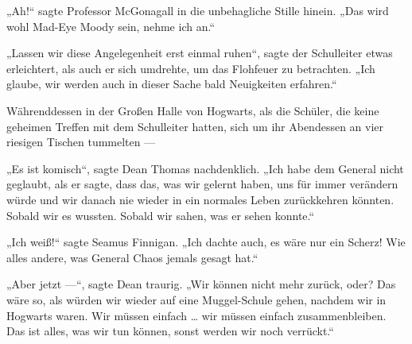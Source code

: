 „Ah!“ sagte Professor McGonagall in die unbehagliche Stille hinein.
„Das wird wohl Mad-Eye Moody sein, nehme ich an.“

„Lassen wir diese Angelegenheit erst einmal ruhen“, sagte der Schulleiter etwas erleichtert, als auch er sich umdrehte, um das Flohfeuer zu betrachten.
„Ich glaube, wir werden auch in dieser Sache bald Neuigkeiten erfahren.“


Währenddessen in der Großen Halle von Hogwarts, als die Schüler, die keine geheimen Treffen mit dem Schulleiter hatten, sich um ihr Abendessen an vier riesigen Tischen tummelten —

„Es ist komisch“, sagte Dean Thomas nachdenklich.
„Ich habe dem General nicht geglaubt, als er sagte, dass das, was wir gelernt haben, uns für immer verändern würde und wir danach nie wieder in ein normales Leben zurückkehren könnten. Sobald wir es wussten. Sobald wir sahen, was er sehen konnte.“

„Ich weiß!“ sagte Seamus Finnigan.
„Ich dachte auch, es wäre nur ein Scherz! Wie alles andere, was General Chaos jemals gesagt hat.“

„Aber jetzt —“, sagte Dean traurig.
„Wir können nicht mehr zurück, oder? Das wäre so, als würden wir wieder auf eine Muggel-Schule gehen, nachdem wir in Hogwarts waren. Wir müssen einfach … wir müssen einfach zusammenbleiben. Das ist alles, was wir tun können, sonst werden wir noch verrückt.“

